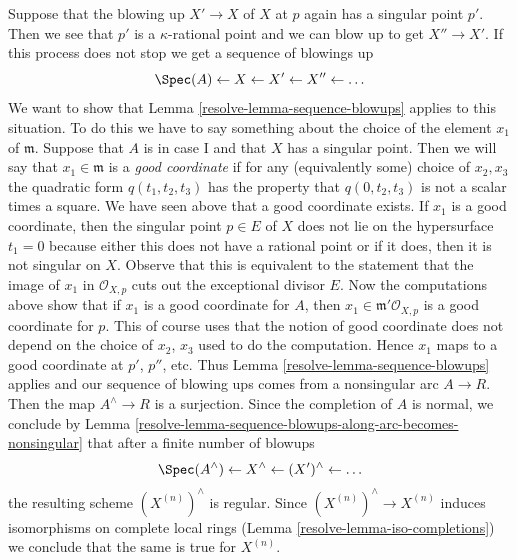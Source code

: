 \medskip\noindent
Suppose that the blowing up $X' \to X$ of $X$ at $p$ again has a
singular point $p'$. Then we see that $p'$ is a $\kappa$-rational
point and we can blow up to get $X'' \to X'$. If this process
does not stop we get a sequence of blowings up
$$
\Spec(A) \leftarrow X \leftarrow X' \leftarrow X'' \leftarrow \ldots
$$
We want to show that
Lemma \ref{resolve-lemma-sequence-blowups}
applies to this situation. To do this we have to say something
about the choice of the element $x_1$ of $\mathfrak m$.
Suppose that $A$ is in case I and that $X$ has a singular point.
Then we will say that $x_1 \in \mathfrak m$ is a {\it good coordinate}
if for any (equivalently some) choice of $x_2, x_3$ the quadratic
form $q(t_1, t_2, t_3)$ has the property that $q(0, t_2, t_3)$
is not a scalar times a square. We have seen above that a good
coordinate exists. If $x_1$ is a good coordinate, then the
singular point $p \in E$ of $X$ does not lie on the hypersurface
$t_1 = 0$ because either this does not have a rational point or
if it does, then it is not singular on $X$. Observe that this
is equivalent to the
statement that the image of $x_1$ in $\mathcal{O}_{X, p}$ cuts
out the exceptional divisor $E$. Now the computations above show
that if $x_1$ is a good coordinate for $A$, then
$x_1 \in \mathfrak m'\mathcal{O}_{X, p}$ is a good coordinate
for $p$. This of course uses that the notion of good coordinate
does not depend on the choice of $x_2$, $x_3$ used to do the
computation. Hence $x_1$ maps to a good coordinate at
$p'$, $p''$, etc. Thus
Lemma \ref{resolve-lemma-sequence-blowups}
applies and our sequence of blowing
ups comes from a nonsingular arc $A \to R$.
Then the map $A^\wedge \to R$ is a surjection.
Since the completion of $A$ is normal, we conclude by
Lemma \ref{resolve-lemma-sequence-blowups-along-arc-becomes-nonsingular}
that after a finite number of blowups
$$
\Spec(A^\wedge) \leftarrow X^\wedge \leftarrow (X')^\wedge \leftarrow \ldots
$$
the resulting scheme $(X^{(n)})^\wedge$ is regular. Since
$(X^{(n)})^\wedge \to X^{(n)}$ induces isomorphisms on complete
local rings (Lemma \ref{resolve-lemma-iso-completions}) we conclude
that the same is true for $X^{(n)}$.

